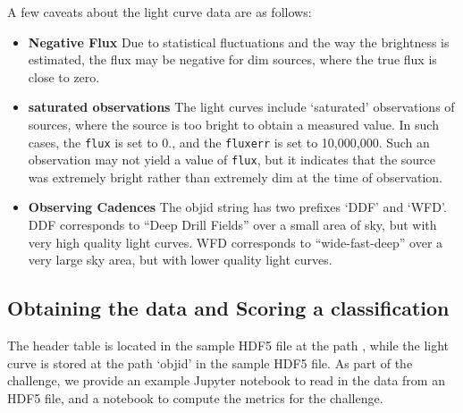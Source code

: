 \documentclass[iop,twocolumn]{emulateapj}
\newcommand{\<}      {\langle}
\renewcommand{\>}    {\rangle}
\begin{document}
A few caveats about the light curve data are as follows:
\begin{itemize}
    \item \textbf{Negative Flux} Due to statistical fluctuations and the way the brightness is estimated, the flux may be negative for dim sources, where the true flux is close to zero. 
    \item \textbf{saturated observations} The light curves include `saturated' observations of sources, where the source is
too bright to obtain a measured value. In such cases, the {\tt flux} is set to 0., and the {\tt fluxerr} is set to 10,000,000. Such an observation may not yield a value of {\tt flux}, but it indicates that the source was extremely bright rather than extremely dim at the time of observation. 
\item \textbf{Observing Cadences} The objid string has two prefixes `DDF’ and `WFD’.  DDF corresponds to
“Deep Drill Fields” over a small area of sky, but with very high quality 
light curves. WFD corresponds to “wide-fast-deep” over a very large 
sky area, but with lower quality light curves.

\end{itemize}

\clearpage

\subsection{Obtaining the data and Scoring a classification}
The header table is located in the sample HDF5 file at the path {\header}, while the light curve is stored at the path `objid' in the sample HDF5 file. As part of the challenge, we provide an example Jupyter notebook to read in the data from an HDF5 file, and a notebook to compute the metrics for the challenge.
\end{document}
